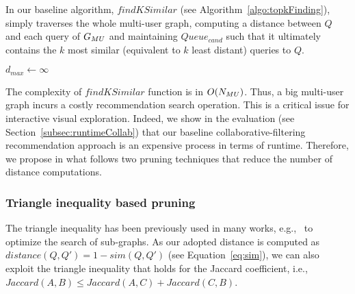 In our baseline algorithm, $findKSimilar$ (see Algorithm~\ref{algo:topkFinding}),
 simply traverses the whole multi-user graph, computing a distance between $Q$ and each query of $G_{MU}$ and maintaining $Queue_{cand}$ such that it ultimately contains the $k$ most similar (equivalent to $k$ least distant) queries to $Q$. 
 \begin{algorithm}[t]
   \caption{$findKSimilar(\usersGraph, \thetaRec, Q, Queue_{candidates})$}
    \label{algo:topkFinding}
 
     $d_{max} \leftarrow \infty $ \;
    \end{algorithm}
The complexity of $findKSimilar$ function is in $O(N_{MU})$. Thus, a big multi-user graph incurs a costly recommendation search operation. This is a critical issue for interactive visual exploration. Indeed, we show in the evaluation (see Section~\ref{subsec:runtimeCollab}) that our baseline collaborative-filtering recommendation approach is an expensive process in terms of runtime. Therefore, we propose in what follows two pruning techniques that reduce the number of distance computations.







    

 
 
 
\subsubsection {Triangle inequality based pruning}
\label{subsec:triangle}

The triangle inequality has been previously used in many works, e.g.,~\cite{Zhu:2012,Ranu:2014} to optimize the search of sub-graphs. As our adopted distance is computed as $distance(Q, Q') = 1 - sim(Q,Q')$ (see Equation~\ref{eq:sim}), we can also exploit the triangle inequality that holds for the Jaccard coefficient, i.e., $Jaccard(A,B)\leq Jaccard(A,C)+Jaccard(C,B)$.


